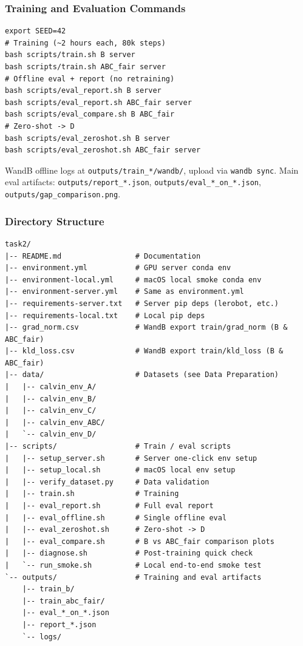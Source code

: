 \documentclass[10pt,twocolumn,letterpaper]{article}
\begin{document}
\subsubsection{Training and Evaluation Commands}

\begin{lstlisting}
export SEED=42
# Training (~2 hours each, 80k steps)
bash scripts/train.sh B server
bash scripts/train.sh ABC_fair server
# Offline eval + report (no retraining)
bash scripts/eval_report.sh B server
bash scripts/eval_report.sh ABC_fair server
bash scripts/eval_compare.sh B ABC_fair
# Zero-shot -> D
bash scripts/eval_zeroshot.sh B server
bash scripts/eval_zeroshot.sh ABC_fair server
\end{lstlisting}

WandB offline logs at \texttt{outputs/train\_*/wandb/}, upload via \texttt{wandb sync}. Main eval artifacts: \texttt{outputs/report\_*.json}, \texttt{outputs/eval\_*\_on\_*.json}, \texttt{outputs/gap\_comparison.png}.

\subsubsection{Directory Structure}

\begin{lstlisting}
task2/
|-- README.md                 # Documentation
|-- environment.yml           # GPU server conda env
|-- environment-local.yml     # macOS local smoke conda env
|-- environment-server.yml    # Same as environment.yml
|-- requirements-server.txt   # Server pip deps (lerobot, etc.)
|-- requirements-local.txt    # Local pip deps
|-- grad_norm.csv             # WandB export train/grad_norm (B & ABC_fair)
|-- kld_loss.csv              # WandB export train/kld_loss (B & ABC_fair)
|-- data/                     # Datasets (see Data Preparation)
|   |-- calvin_env_A/
|   |-- calvin_env_B/
|   |-- calvin_env_C/
|   |-- calvin_env_ABC/
|   `-- calvin_env_D/
|-- scripts/                  # Train / eval scripts
|   |-- setup_server.sh       # Server one-click env setup
|   |-- setup_local.sh        # macOS local env setup
|   |-- verify_dataset.py     # Data validation
|   |-- train.sh              # Training
|   |-- eval_report.sh        # Full eval report
|   |-- eval_offline.sh       # Single offline eval
|   |-- eval_zeroshot.sh      # Zero-shot -> D
|   |-- eval_compare.sh       # B vs ABC_fair comparison plots
|   |-- diagnose.sh           # Post-training quick check
|   `-- run_smoke.sh          # Local end-to-end smoke test
`-- outputs/                  # Training and eval artifacts
    |-- train_b/
    |-- train_abc_fair/
    |-- eval_*_on_*.json
    |-- report_*.json
    `-- logs/
\end{lstlisting}
\end{document}
